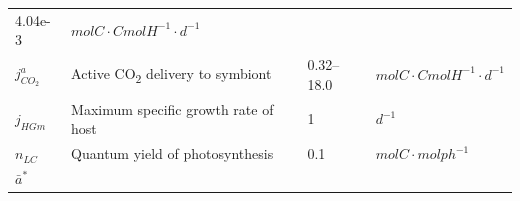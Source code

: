 \documentclass[]{elsarticle} %
\begin{document}
\begin{longtable}[c]{@{}llll@{}}
\begin{minipage}[t]{0.09\columnwidth}
4.04e-3
\strut\end{minipage} &
\begin{minipage}[t]{0.23\columnwidth}\raggedright\strut
\(molC \cdot CmolH^{-1} \cdot d^{-1}\)
\strut\end{minipage}\tabularnewline
\begin{minipage}[t]{0.10\columnwidth}\raggedright\strut
\(j_{CO_2}^a\)
\strut\end{minipage} &
\begin{minipage}[t]{0.48\columnwidth}\raggedright\strut
Active CO\textsubscript{2} delivery to symbiont
\strut\end{minipage} &
\begin{minipage}[t]{0.09\columnwidth}\raggedright\strut
0.32--18.0
\strut\end{minipage} &
\begin{minipage}[t]{0.23\columnwidth}\raggedright\strut
\(molC \cdot CmolH^{-1} \cdot d^{-1}\)
\strut\end{minipage}\tabularnewline
\begin{minipage}[t]{0.10\columnwidth}\raggedright\strut
\(j_{HGm}\)
\strut\end{minipage} &
\begin{minipage}[t]{0.48\columnwidth}\raggedright\strut
Maximum specific growth rate of host
\strut\end{minipage} &
\begin{minipage}[t]{0.09\columnwidth}\raggedright\strut
1
\strut\end{minipage} &
\begin{minipage}[t]{0.23\columnwidth}\raggedright\strut
\(d^{-1}\)
\strut\end{minipage}\tabularnewline
\begin{minipage}[t]{0.10\columnwidth}\raggedright\strut
\(n_{LC}\)
\strut\end{minipage} &
\begin{minipage}[t]{0.48\columnwidth}\raggedright\strut
Quantum yield of photosynthesis
\strut\end{minipage} &
\begin{minipage}[t]{0.09\columnwidth}\raggedright\strut
0.1
\strut\end{minipage} &
\begin{minipage}[t]{0.23\columnwidth}\raggedright\strut
\(molC \cdot mol ph^{-1}\)
\strut\end{minipage}\tabularnewline
\begin{minipage}[t]{0.10\columnwidth}\raggedright\strut
\(\bar{a}^*\)
\strut\end{minipage} &

\end{longtable}
\end{document}
